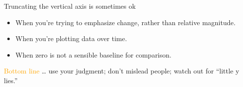 \documentclass[
  ignorenonframetext,
]{beamer}
\providecommand{\tightlist}{%
  \setlength{\itemsep}{0pt}\setlength{\parskip}{0pt}}
\begin{document}
\begin{frame}{}
\label{section-8}
\end{frame}

\begin{frame}{}
\label{section-9}
\end{frame}

\begin{frame}{Truncating the vertical axis is sometimes ok}
\label{truncating-the-vertical-axis-is-sometimes-ok}
\begin{itemize}
\tightlist
\item
  When you're trying to emphasize change, rather than relative
  magnitude.
\item
  When you're plotting data over time.
\item
  When zero is not a sensible baseline for comparison.
\end{itemize}

\textcolor{orange}{Bottom line} \ldots{} use your judgment; don't
mislead people; watch out for ``little y lies.''
\end{frame}
\end{document}
